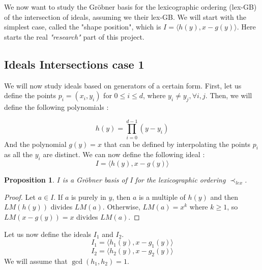 \documentclass{article}
\newtheorem{proposition}{Proposition}[section]
\begin{document}
\par We now want to study the Gröbner basis for the lexicographic ordering (lex-GB) of the intersection of ideals, assuming we their lex-GB.
We will start with the simplest case, called the "shape position", which is $I = \langle h(y), x - g(y) \rangle$. Here starts the real \textit{"research"} part of this project. \\


\subsection*{Ideals Intersections case 1}

\begin{flushleft}

We will now study ideals based on generators of a certain form. 
First, let us define the points $p_{i} = (x_{i}, y_{i})$ for $0 \leq i \leq d$, where $y_{i} \neq y_{j}, \forall i, j$. 
Then, we will define the following polynomials : 

\begin{displaymath}
    h(y) = \prod_{i=0}^{d-1} (y - y_{i}) 
\end{displaymath}
And the polynomial $g(y) = x$ that can be defined by interpolating the points $p_{i}$ as all the $y_{i}$ are distinct.
We can now define the following ideal :
\begin{displaymath}
    I = \langle h(y), x - g(y) \rangle
\end{displaymath}
\begin{proposition}
    $I$ is a Gröbner basis of I for the lexicographic ordering $\prec_{lex}$.  
\end{proposition}
\begin{proof}
    Let $a \in I$. If $a$ is purely in $y$, then $a$ is a multiple of $h(y)$ and then $LM(h(y))$ divides $LM(a)$. Otherwise, $LM(a) = x^{k}$ where $k \geq 1$, so $LM(x - g(y)) = x$ divides $LM(a)$.
\end{proof}
Let us now define the ideals $I_{1}$ and $I_{2}$. 
\begin{displaymath}
    I_{1} = \langle h_{1}(y), x - g_{1}(y) \rangle
\end{displaymath}
\begin{displaymath}
    I_{2} = \langle h_{2}(y), x - g_{2}(y) \rangle
\end{displaymath}
We will assume that $\gcd(h_{1}, h_{2}) = 1$.


\end{flushleft}
\end{document}
